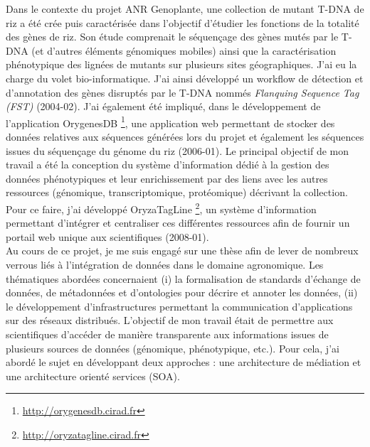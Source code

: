 Dans le contexte du projet ANR Genoplante, une collection de mutant T-DNA de riz a été crée puis caractérisée dans l'objectif d'étudier les fonctions de la totalité des gènes de riz. Son étude comprenait le séquençage des gènes mutés par le T-DNA (et d'autres éléments génomiques mobiles) ainsi que la caractérisation phénotypique des lignées de mutants sur plusieurs sites géographiques. J'ai eu la charge du volet bio-informatique. J'ai ainsi développé un workflow de détection et d'annotation des  gènes disruptés par le T-DNA nommés \textit{Flanquing Sequence Tag (FST)}  (2004-02). J'ai également été impliqué, dans le développement de l'application OrygenesDB \footnote{\url{http://orygenesdb.cirad.fr}}, une application web permettant de stocker des données relatives aux séquences générées lors du projet et également les séquences issues du séquençage du génome du riz (2006-01). Le principal objectif de mon travail a été la conception du système d'information dédié à la gestion des données phénotypiques et leur enrichissement par des liens avec les autres ressources (génomique, transcriptomique, protéomique) décrivant la collection. Pour ce faire, j’ai développé OryzaTagLine \footnote{\url{http://oryzatagline.cirad.fr}}, un système d’information permettant d’intégrer et centraliser ces différentes ressources afin de fournir un portail web unique aux scientifiques (2008-01).\\

Au cours de ce projet, je me suis engagé sur une thèse afin de lever de nombreux verrous liés à l’intégration de données dans le domaine agronomique. Les thématiques abordées concernaient (i) la formalisation de standards d’échange de données, de métadonnées et d’ontologies pour décrire et annoter les données, (ii) le développement d’infrastructures permettant la communication d’applications sur des réseaux distribués. L’objectif de mon travail était de permettre aux scientifiques d'accéder de manière transparente aux informations issues de plusieurs sources de données (génomique, phénotypique, etc.).  Pour cela, j’ai abordé le sujet en développant deux approches : une architecture de médiation et une architecture orienté services (SOA).  

